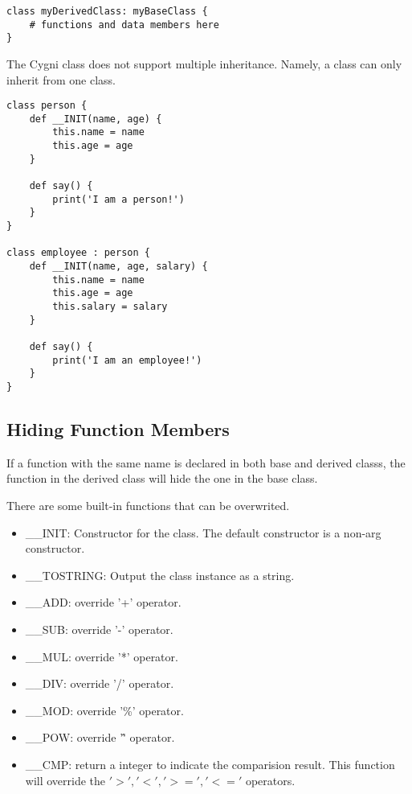 \begin{lstlisting}
class myDerivedClass: myBaseClass {
	# functions and data members here
}
\end{lstlisting} 

The Cygni class does not support multiple inheritance. Namely, a class can only inherit from one class.

\begin{lstlisting}
class person {
	def __INIT(name, age) {
		this.name = name
		this.age = age
	}

	def say() {
		print('I am a person!')
	}
}

class employee : person {
	def __INIT(name, age, salary) {
		this.name = name
		this.age = age
		this.salary = salary
	}

	def say() {
		print('I am an employee!')
	}
}
\end{lstlisting}


\subsection{Hiding Function Members}
If a function with the same name is declared in both base and derived classs, the function in the derived class will hide the one in the base class.

There are some built-in functions that can be overwrited.
\begin{itemize}
	\item \_\_INIT: Constructor for the class. The default constructor is a non-arg constructor.
	\item \_\_TOSTRING: Output the class instance as a string.
	\item \_\_ADD: override '+' operator.
	\item \_\_SUB: override '-' operator.
	\item \_\_MUL: override '*' operator.
	\item \_\_DIV: override '/' operator.
	\item \_\_MOD: override '\%' operator.
	\item \_\_POW: override '\^' operator.
	\item \_\_CMP: return a integer to indicate the comparision result. This function will override the $'>', '<', '>=', '<='$ operators.
\end{itemize}


